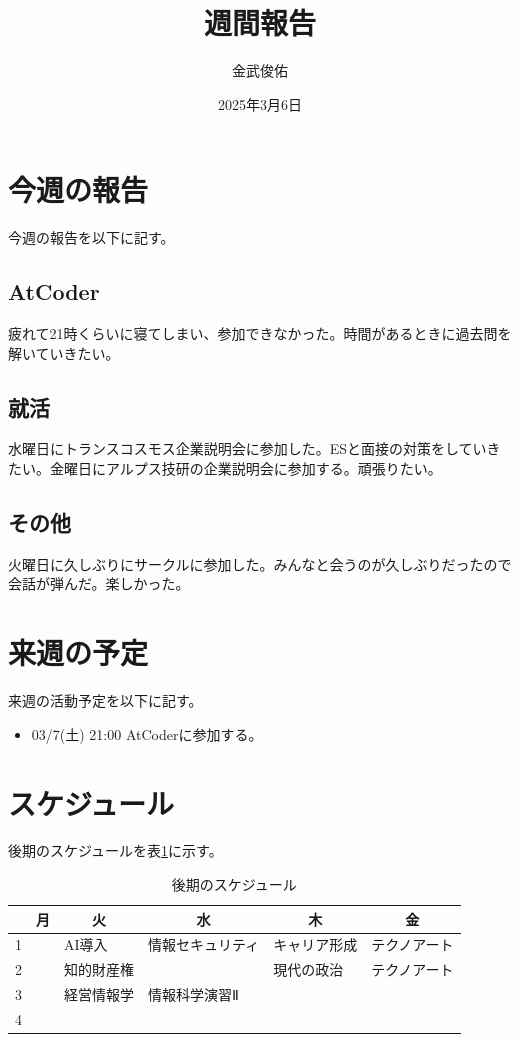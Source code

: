 \documentclass[a4paper,12pt]{ujarticle}
\title{週間報告}
\author{金武俊佑}
\date{2025年3月6日}
\newcommand{\thc}[1]{\multicolumn{1}{c|}{#1}}
\begin{document}
\maketitle

\section{今週の報告}\label{sec:thisweek}
今週の報告を以下に記す。
\subsection{AtCoder}\label{sec:atcoder}
疲れて21時くらいに寝てしまい、参加できなかった。時間があるときに過去問を解いていきたい。
\subsection{就活}\label{sec:job}
水曜日にトランスコスモス企業説明会に参加した。ESと面接の対策をしていきたい。金曜日にアルプス技研の企業説明会に参加する。頑張りたい。
\subsection{その他}\label{sec:other}
火曜日に久しぶりにサークルに参加した。みんなと会うのが久しぶりだったので会話が弾んだ。楽しかった。
\section{来週の予定}\label{sec:nextweek}
来週の活動予定を以下に記す。
\begin{itemize}
  \item 03/7(土) 21:00 AtCoderに参加する。
\end{itemize}
\section{スケジュール}\label{sec:schedule}
後期のスケジュールを表\ref{tab:studyschedule}に示す。

\begin{table}[H]
  \caption{後期のスケジュール}\label{tab:studyschedule}
  \centering
  \begin{tabular}{|p{4mm}||p{30mm}|p{30mm}|p{30mm}|p{30mm}|p{30mm}|}\hline
        & \thc{月} & \thc{火} & \thc{水} & \thc{木} & \thc{金} \\ \hline\hline
     1  &     & AI導入    &情報セキュリティ     & キャリア形成 & テクノアート  \\ \hline
     2  &     & 知的財産権 &  & 現代の政治 & テクノアート \\ \hline
     3  &     & 経営情報学 & 情報科学演習Ⅱ &  &  \\ \hline
     4  &  &  & &  & \\ \hline
  \end{tabular}
\end{table}
\end{document}
